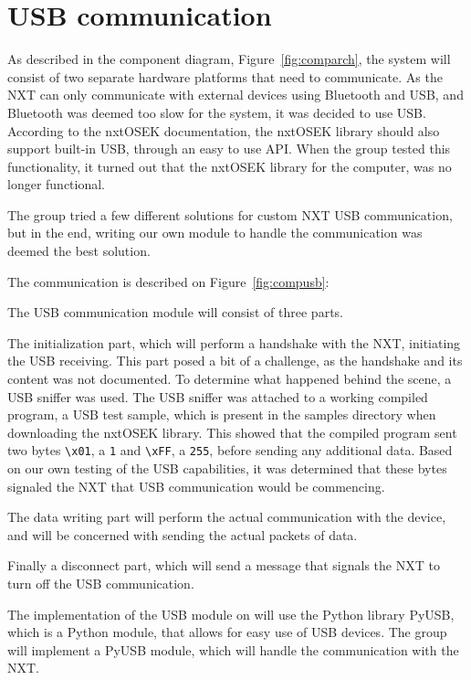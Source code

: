 \section{USB communication}
\label{sec:usbdes}
As described in the component diagram, Figure~\ref{fig:comparch}, the system will consist of two separate hardware platforms that need to communicate.
As the NXT can only communicate with external devices using Bluetooth and USB, and Bluetooth was deemed too slow for the system, it was decided to use USB.
According to the nxtOSEK documentation, the nxtOSEK library should also support built-in USB, through an easy to use API\cite{ecrobotUSB}.
When the group tested this functionality, it turned out that the nxtOSEK library for the computer, was no longer functional.

The group tried a few different solutions for custom NXT USB communication, but in the end, writing our own module to handle the communication was deemed the best solution.

The communication is described on Figure~\ref{fig:compusb}:


The USB communication module will consist of three parts.

The initialization part, which will perform a handshake with the NXT, initiating the USB receiving.
This part posed a bit of a challenge, as the handshake and its content was not documented.
To determine what happened behind the scene, a USB sniffer was used.
The USB sniffer was attached to a working compiled program, a USB test sample, which is present in the samples directory when downloading the nxtOSEK library\cite{ecrobotUSB}.
This showed that the compiled program sent two bytes \texttt{\textbackslash{}x01}, a \texttt{1} and \texttt{\textbackslash{}xFF}, a \texttt{255}, before sending any additional data.%
Based on our own testing of the USB capabilities, it was determined that these bytes signaled the NXT that USB communication would be commencing.

The data writing part will perform the actual communication with the device, and will be concerned with sending the actual packets of data.

Finally a disconnect part, which will send a message that signals the NXT to turn off the USB communication.

The implementation of the USB module on will use the Python library PyUSB, which is a Python module, that allows for easy use of USB devices\cite{PyUSB}.
The group will implement a PyUSB module, which will handle the communication with the NXT.
